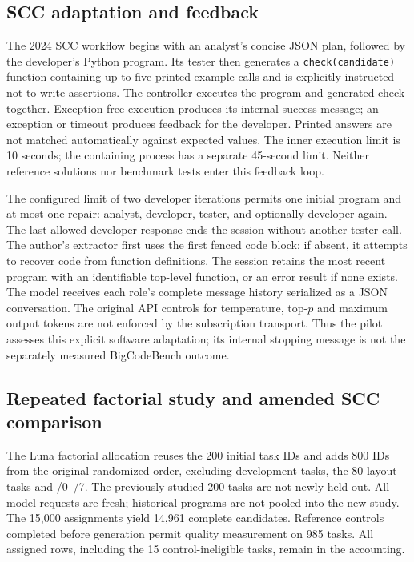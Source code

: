 \subsection{SCC adaptation and feedback}
The 2024 SCC workflow begins with an analyst's concise JSON plan, followed by the developer's Python program. Its tester then generates a \texttt{check(candidate)} function containing up to five printed example calls and is explicitly instructed not to write assertions. The controller executes the program and generated check together. Exception-free execution produces its internal success message; an exception or timeout produces feedback for the developer. Printed answers are not matched automatically against expected values. The inner execution limit is 10 seconds; the containing process has a separate 45-second limit. Neither reference solutions nor benchmark tests enter this feedback loop.

The configured limit of two developer iterations permits one initial program and at most one repair: analyst, developer, tester, and optionally developer again. The last allowed developer response ends the session without another tester call. The author's extractor first uses the first fenced code block; if absent, it attempts to recover code from function definitions. The session retains the most recent program with an identifiable top-level function, or an error result if none exists. The model receives each role's complete message history serialized as a JSON conversation. The original API controls for temperature, top-$p$ and maximum output tokens are not enforced by the subscription transport. Thus the pilot assesses this explicit software adaptation; its internal stopping message is not the separately measured BigCodeBench outcome.

\subsection{Repeated factorial study and amended SCC comparison}
\label{app:expanded-studies}
The Luna factorial allocation reuses the 200 initial task IDs and adds 800 IDs from the original randomized order, excluding development tasks, the 80 layout tasks and /0--/7. The previously studied 200 tasks are not newly held out. All model requests are fresh; historical programs are not pooled into the new study. The 15,000 assignments yield 14,961 complete candidates. Reference controls completed before generation permit quality measurement on 985 tasks. All assigned rows, including the 15 control-ineligible tasks, remain in the accounting.

